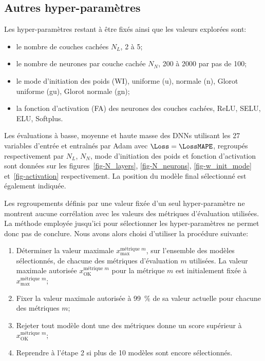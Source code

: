 \subsection{Autres hyper-paramètres}\label{chapter-ML-section-hyperparameters-others}
Les hyper-paramètres restant à être fixés ainsi que les valeurs explorées sont:
\begin{itemize}
\item le nombre de couches cachées $N_L$, 2 à 5;
\item le nombre de neurones par couche cachée $N_N$, \num{200} à \num{2000} par pas de \num{100};
\item le mode d'initiation des poids (WI), uniforme (u), normale (n), Glorot uniforme (gu), Glorot normale (gn);
\item la fonction d'activation (FA) des neurones des couches cachées, ReLU, SELU, ELU, Softplus.
\end{itemize}
Les évaluations
à basse, moyenne et haute masse
des DNNs
utilisant les 27 variables d'entrée
et
entraînés par Adam avec $\Loss=\LossMAPE$,
regroupés respectivement par
$N_L$, $N_N$, mode d'initiation des poids et fonction d'activation
sont données sur les
figures~\ref{fig-N_layers}, \ref{fig-N_neurons}, \ref{fig-w_init_mode} et~\ref{fig-activation} respectivement.
La position du modèle final sélectionné est également indiquée.
\def\localHP{N_layers}
\def\localHPlong{$N_L$}

\def\localHP{N_neurons}
\def\localHPlong{$N_N$}

\def\localHP{w_init_mode}
\def\localHPlong{le mode d'initiation des poids}

\def\localHP{activation}
\def\localHPlong{la fonction d'activation}

\par
Les regroupements définis par une valeur fixée d'un seul hyper-paramètre ne montrent aucune corrélation
avec les valeurs des métriques d'évaluation utilisées.
La méthode employée jusqu'ici pour sélectionner les hyper-paramètres ne permet donc pas de conclure.
Nous avons alors choisi d'utiliser la procédure suivante:
\begin{enumerate}
\item Déterminer la valeur maximale $x_\text{max}^\text{métrique $m$}$, sur l'ensemble des modèles sélectionnés, de chacune des métriques d'évaluation $m$ utilisées.
La valeur maximale autorisée $x_\text{OK}^\text{métrique $m$}$ pour la métrique $m$ est initialement fixée à $x_\text{max}^\text{métrique $m$}$;
\item Fixer la valeur maximale autorisée à \SI{99}{\%} de sa valeur actuelle pour chacune des métriques $m$;
\item Rejeter tout modèle dont une des métriques donne un score supérieur à $x_\text{OK}^\text{métrique $m$}$;
\item Reprendre à l'étape 2 si plus de 10 modèles sont encore sélectionnés.
\end{enumerate}
